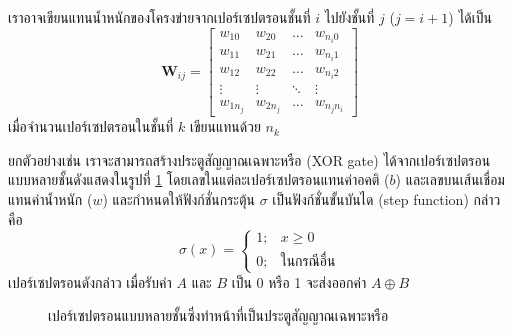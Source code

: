 \documentclass{cpereport}
\begin{document}
เราอาจเขียนแทนน้ำหนักของโครงข่ายจากเปอร์เซปตรอนชั้นที่ $i$ ไปยังชั้นที่ $j$ ($j=i+1$) ได้เป็น
\begin{equation*}
    \boldsymbol{W}_{ij} = 
    \begin{bmatrix}
        w_{10} & w_{20} & \dots & w_{n_{i}0}\\
        w_{11} & w_{21} & \dots & w_{n_{i}1}\\
        w_{12} & w_{22} & \dots & w_{n_{i}2}\\
        \vdots & \vdots & \ddots & \vdots\\
        w_{1n_j} & w_{2n_j} & \dots & w_{n_jn_i}
    \end{bmatrix}
\end{equation*}
เมื่อจำนวนเปอร์เซปตรอนในชั้นที่ $k$ เขียนแทนด้วย $n_k$

ยกตัวอย่างเช่น เราจะสามารถสร้างประตูสัญญาณเฉพาะหรือ (XOR gate) ได้จากเปอร์เซปตรอนแบบหลายชั้นดังแสดงในรูปที่ \ref{xor-mlp} โดยเลขในแต่ละเปอร์เซปตรอนแทนค่าอคติ ($b$) และเลขบนเส้นเชื่อมแทนค่าน้ำหนัก ($w$) และกำหนดให้ฟังก์ชั่นกระตุ้น $\sigma$ เป็นฟังก์ชั่นขั้นบันได (step function) กล่าวคือ
\begin{equation*}
    \sigma(x) =
    \begin{cases}
        1; & x \geq 0\\
        0; & \textrm{ในกรณีอื่น}
    \end{cases}
\end{equation*}
เปอร์เซปตรอนดังกล่าว เมื่อรับค่า $A$ และ $B$ เป็น 0 หรือ 1 จะส่งออกค่า $A \oplus B$

\begin{figure}
    \def\layersep{2.5cm}
    \centering
    \caption{เปอร์เซปตรอนแบบหลายชั้นซึ่งทำหน้าที่เป็นประตูสัญญาณเฉพาะหรือ}
    \label{xor-mlp}
\end{figure}
\end{document}
